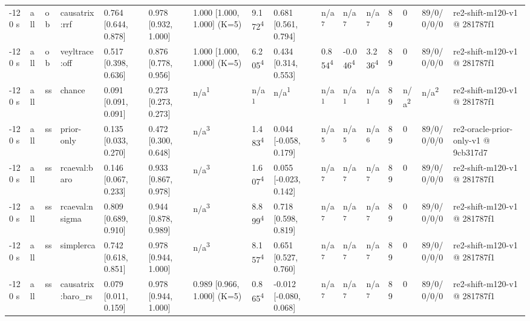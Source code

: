 \begin{table}[t]
\begin{tabular}{llllllllllllllll}
-120 s & all & ob & causatrix:rrf & 0.764 [0.644, 0.878] & 0.978 [0.932, 1.000] & 1.000 [1.000, 1.000] (K=5) & 9.172\textsuperscript{4} & 0.681 [0.561, 0.794] & n/a\textsuperscript{7} & n/a\textsuperscript{7} & n/a\textsuperscript{7} & 89 & 0 & 89/0/0/0/0 & re2-shift-m120-v1 @ 281787f1 \\
-120 s & all & ob & veyltrace:off & 0.517 [0.398, 0.636] & 0.876 [0.778, 0.956] & 1.000 [1.000, 1.000] (K=5) & 6.205\textsuperscript{4} & 0.434 [0.314, 0.553] & 0.854\textsuperscript{4} & -0.046\textsuperscript{4} & 3.236\textsuperscript{4} & 89 & 0 & 89/0/0/0/0 & re2-shift-m120-v1 @ 281787f1 \\
-120 s & all & ss & chance & 0.091 [0.091, 0.091] & 0.273 [0.273, 0.273] & n/a\textsuperscript{1} & n/a\textsuperscript{1} & n/a\textsuperscript{1} & n/a\textsuperscript{1} & n/a\textsuperscript{1} & n/a\textsuperscript{1} & 89 & n/a\textsuperscript{2} & n/a\textsuperscript{2} & re2-shift-m120-v1 @ 281787f1 \\
-120 s & all & ss & prior-only & 0.135 [0.033, 0.270] & 0.472 [0.300, 0.648] & n/a\textsuperscript{3} & 1.483\textsuperscript{4} & 0.044 [-0.058, 0.179] & n/a\textsuperscript{5} & n/a\textsuperscript{5} & n/a\textsuperscript{6} & 89 & 0 & 89/0/0/0/0 & re2-oracle-prior-only-v1 @ 9cb317d7 \\
-120 s & all & ss & rcaeval:baro & 0.146 [0.067, 0.233] & 0.933 [0.867, 0.978] & n/a\textsuperscript{3} & 1.607\textsuperscript{4} & 0.055 [-0.023, 0.142] & n/a\textsuperscript{7} & n/a\textsuperscript{7} & n/a\textsuperscript{7} & 89 & 0 & 89/0/0/0/0 & re2-shift-m120-v1 @ 281787f1 \\
-120 s & all & ss & rcaeval:nsigma & 0.809 [0.689, 0.910] & 0.944 [0.878, 0.989] & n/a\textsuperscript{3} & 8.899\textsuperscript{4} & 0.718 [0.598, 0.819] & n/a\textsuperscript{7} & n/a\textsuperscript{7} & n/a\textsuperscript{7} & 89 & 0 & 89/0/0/0/0 & re2-shift-m120-v1 @ 281787f1 \\
-120 s & all & ss & simplerca & 0.742 [0.618, 0.851] & 0.978 [0.944, 1.000] & n/a\textsuperscript{3} & 8.157\textsuperscript{4} & 0.651 [0.527, 0.760] & n/a\textsuperscript{7} & n/a\textsuperscript{7} & n/a\textsuperscript{7} & 89 & 0 & 89/0/0/0/0 & re2-shift-m120-v1 @ 281787f1 \\
-120 s & all & ss & causatrix:baro\_rs & 0.079 [0.011, 0.159] & 0.978 [0.944, 1.000] & 0.989 [0.966, 1.000] (K=5) & 0.865\textsuperscript{4} & -0.012 [-0.080, 0.068] & n/a\textsuperscript{7} & n/a\textsuperscript{7} & n/a\textsuperscript{7} & 89 & 0 & 89/0/0/0/0 & re2-shift-m120-v1 @ 281787f1 \\

\end{tabular}
\end{table}
